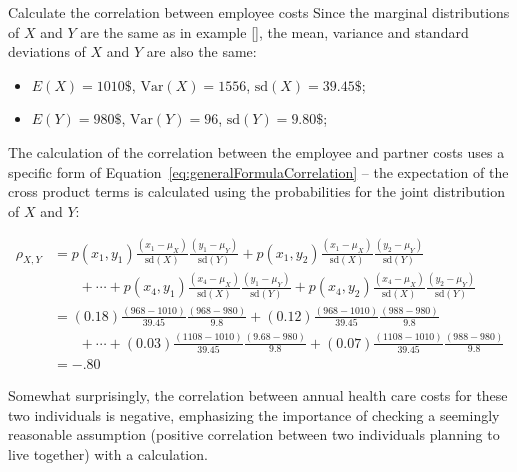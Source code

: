 

\begin{example}{Calculate the correlation between employee costs} 
Since the marginal distributions of $X$ and $Y$ are the same as in example \ref{}, the mean, variance and standard deviations of $X$ and $Y$ are also the same:

\begin{itemize}
	\item $E(X) = 1010\$$, $\textrm{Var}(X) = 1556$, $\textrm{sd}(X) = 39.45\$$;
	
	\item $E(Y) = 980\$$, $\textrm{Var}(Y)= 96$, $\textrm{sd}(Y) = 9.80\$$;
	
\end{itemize}
	
The calculation of the correlation between the employee and partner costs uses a specific form of Equation~\ref{eq:generalFormulaCorrelation} -- the expectation of the cross product terms is calculated using the probabilities for the joint distribution of $X$ and $Y$:

\begin{align*}
	\rho_{X,Y} &= p(x_1,y_1) \frac{(x_1 - \mu_X)}{\textrm{sd}(X)}\frac{(y_1 - \mu_Y)}{\textrm{sd}(Y)} 
           + p(x_1,y_2)\frac{(x_1 - \mu_X)}{\textrm{sd}(X)}\frac{(y_2 - \mu_Y)}{\textrm{sd}(Y)}  \\
		    &\phantom{{}=1} + \cdots + p(x_4,y_1)\frac{(x_4 - \mu_X)}{\textrm{sd}(X)}\frac{(y_1 - \mu_Y)}{\textrm{sd}(Y)} + p(x_4,y_2)\frac{(x_4 - \mu_X)}{\textrm{sd}(X)}\frac{(y_2 - \mu_Y)}{\textrm{sd}(Y)} \\
	&= (0.18) \frac{(968 - 1010)}{39.45}\frac{(968 - 980)}{9.8} 
           + (0.12)\frac{(968 - 1010)}{39.45}\frac{(988 - 980)}{9.8}  \\
		    &\phantom{{}=1} + \cdots + (0.03)\frac{(1108 - 1010)}{39.45}\frac{(9.68 - 980)}{9.8} + (0.07)\frac{(1108 - 1010)}{39.45}\frac{(988 - 980)}{9.8} \\
	&= -.80
\end{align*} 

Somewhat surprisingly, the correlation between annual health care costs for these two individuals is negative, emphasizing the importance of checking a seemingly reasonable assumption (positive correlation between two individuals planning to live together) with a calculation.
\end{example}


